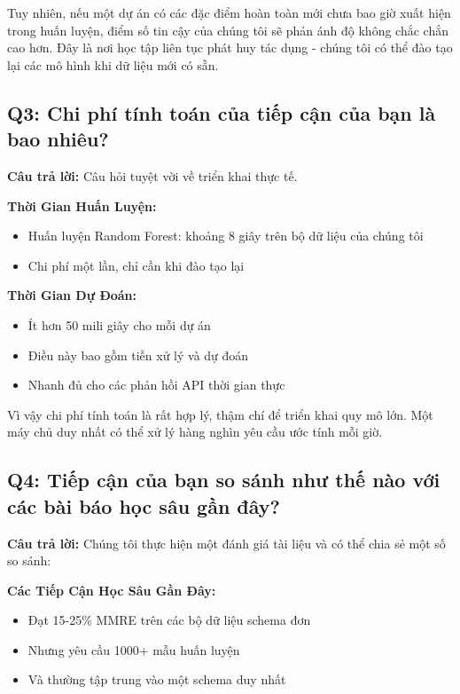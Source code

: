 \documentclass[12pt,a4paper]{article}
\begin{document}
Tuy nhiên, nếu một dự án có các đặc điểm hoàn toàn mới chưa bao giờ xuất hiện trong huấn luyện, điểm số tin cậy của chúng tôi sẽ phản ánh độ không chắc chắn cao hơn. Đây là nơi học tập liên tục phát huy tác dụng - chúng tôi có thể đào tạo lại các mô hình khi dữ liệu mới có sẵn.

\subsection*{Q3: Chi phí tính toán của tiếp cận của bạn là bao nhiêu?}

\textbf{Câu trả lời:} Câu hỏi tuyệt vời về triển khai thực tế.

\textbf{Thời Gian Huấn Luyện:}
\begin{itemize}
    \item Huấn luyện Random Forest: khoảng 8 giây trên bộ dữ liệu của chúng tôi
    \item Chi phí một lần, chỉ cần khi đào tạo lại
\end{itemize}

\textbf{Thời Gian Dự Đoán:}
\begin{itemize}
    \item Ít hơn 50 mili giây cho mỗi dự án
    \item Điều này bao gồm tiền xử lý và dự đoán
    \item Nhanh đủ cho các phản hồi API thời gian thực
\end{itemize}

Vì vậy chi phí tính toán là rất hợp lý, thậm chí để triển khai quy mô lớn. Một máy chủ duy nhất có thể xử lý hàng nghìn yêu cầu ước tính mỗi giờ.

\subsection*{Q4: Tiếp cận của bạn so sánh như thế nào với các bài báo học sâu gần đây?}

\textbf{Câu trả lời:} Chúng tôi thực hiện một đánh giá tài liệu và có thể chia sẻ một số so sánh:

\textbf{Các Tiếp Cận Học Sâu Gần Đây:}
\begin{itemize}
    \item Đạt 15-25\% MMRE trên các bộ dữ liệu schema đơn
    \item Nhưng yêu cầu 1000+ mẫu huấn luyện
    \item Và thường tập trung vào một schema duy nhất
\end{itemize}
\end{document}
